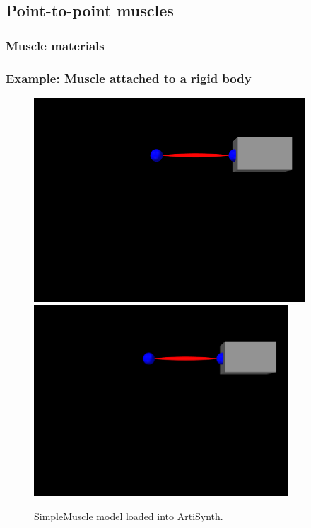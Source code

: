 
\subsection{Point-to-point muscles}
\label{PointToPointMuscles:sec}

\subsubsection{Muscle materials}

\subsubsection{Example: Muscle attached to a rigid body}

\begin{figure}[h]
\begin{center}
\iflatexml
 \includegraphics[]{images/SimpleMuscle}
\else
 \includegraphics[width=3.75in]{images/SimpleMuscle}
\fi
\end{center}
\caption{SimpleMuscle model loaded into ArtiSynth.}
\label{SimpleMuscle:fig}
\end{figure}

